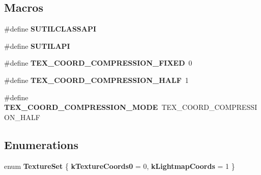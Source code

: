 \subsection*{Macros}
\begin{DoxyCompactItemize}
\item 
\mbox{\label{group___mesh_module_ga22232a1f7a2d87cc6f5ae1e48a4e8437}} 
\#define {\bfseries S\+U\+T\+I\+L\+C\+L\+A\+S\+S\+A\+PI}
\item 
\mbox{\label{group___mesh_module_ga12d2e7f5793a4725ea90451a7135b67d}} 
\#define {\bfseries S\+U\+T\+I\+L\+A\+PI}
\item 
\mbox{\label{group___mesh_module_ga97f5a75eb316b29378911fbf0f5740cd}} 
\#define {\bfseries T\+E\+X\+\_\+\+C\+O\+O\+R\+D\+\_\+\+C\+O\+M\+P\+R\+E\+S\+S\+I\+O\+N\+\_\+\+F\+I\+X\+ED}~0
\item 
\mbox{\label{group___mesh_module_ga89b19c84eadb09d0f3dc7c9501f3d431}} 
\#define {\bfseries T\+E\+X\+\_\+\+C\+O\+O\+R\+D\+\_\+\+C\+O\+M\+P\+R\+E\+S\+S\+I\+O\+N\+\_\+\+H\+A\+LF}~1
\item 
\mbox{\label{group___mesh_module_ga7780197ed9d6830c5a039f5ee311cd57}} 
\#define {\bfseries T\+E\+X\+\_\+\+C\+O\+O\+R\+D\+\_\+\+C\+O\+M\+P\+R\+E\+S\+S\+I\+O\+N\+\_\+\+M\+O\+DE}~T\+E\+X\+\_\+\+C\+O\+O\+R\+D\+\_\+\+C\+O\+M\+P\+R\+E\+S\+S\+I\+O\+N\+\_\+\+H\+A\+LF
\end{DoxyCompactItemize}
\subsection*{Enumerations}
\begin{DoxyCompactItemize}
\item 
\mbox{\label{group___mesh_module_gaa0909d5ef26a080f1a19f2cdeb1eadf3}} 
enum {\bfseries Texture\+Set} \{ {\bfseries k\+Texture\+Coords0} = 0, 
{\bfseries k\+Lightmap\+Coords} = 1
 \}
\end{DoxyCompactItemize}
